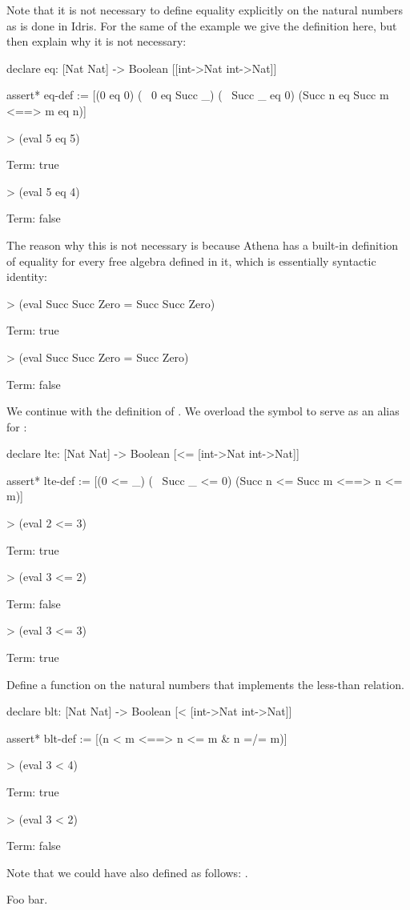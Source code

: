 Note that it is not necessary to define equality explicitly on the natural numbers as is done in Idris. 
For the same of the example we give the definition here, but then explain why it is not necessary: 
\begin{tcAthena}
declare eq: [Nat Nat] -> Boolean [[int->Nat int->Nat]]

assert* eq-def := [(0 eq 0)
                   (~ 0 eq Succ _)
                   (~ Succ _ eq 0)
                   (Succ n eq Succ m <==> m eq n)]

> (eval 5 eq 5)

Term: true 

> (eval 5 eq 4)

Term: false
\end{tcAthena}
The reason why this is not necessary is because Athena has a built-in definition of equality for
every free algebra defined in it, which is essentially syntactic identity: 
\begin{tcAthena}
> (eval Succ Succ Zero = Succ Succ Zero)

Term: true

> (eval Succ Succ Zero = Succ Zero)

Term: false
\end{tcAthena}

We continue with the definition of . We overload the symbol \smtt{<=} to serve as an alias for :
\begin{tcAthena}
declare lte: [Nat Nat] -> Boolean [<= [int->Nat int->Nat]]

assert* lte-def := [(0 <= _)
                    (~ Succ _ <= 0)
                    (Succ n <= Succ m <==> n <= m)]

> (eval 2 <= 3)

Term: true
      
> (eval 3 <= 2)
      
Term: false

> (eval 3 <= 3)

Term: true
\end{tcAthena}
\begin{exercise}[subtitle={\mbox{\rm{\em (SF Exercise 6.0.2, pp. 19-20)}}}]
Define a function  on the natural numbers that implements the less-than relation. 
\end{exercise}
\begin{solution}
\begin{tcAthena}
declare blt: [Nat Nat] -> Boolean [< [int->Nat int->Nat]]

assert* blt-def := [(n < m <==> n <= m & n =/= m)]

> (eval 3 < 4)

Term: true

> (eval 3 < 2)

Term: false
\end{tcAthena}
Note that we could have also defined  as follows: .
\end{solution}
Foo bar. 

